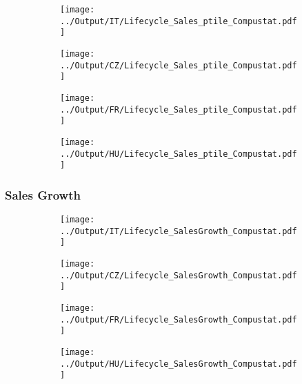 \documentclass[12pt,notitlepage]{article}
\begin{document}
\begin{figure}[!htpb]
\centering
\caption{Sales (Percentile)}
\begin{subfigure}{.49\textwidth}
    \centering
 \texttt{[image: ../Output/IT/Lifecycle\_Sales\_ptile\_Compustat.pdf]}
\end{subfigure}%
\begin{subfigure}{.49\textwidth}
    \centering
 \texttt{[image: ../Output/CZ/Lifecycle\_Sales\_ptile\_Compustat.pdf]}
\end{subfigure}
\begin{subfigure}{.49\textwidth}
    \centering
 \texttt{[image: ../Output/FR/Lifecycle\_Sales\_ptile\_Compustat.pdf]}
\end{subfigure}%
\begin{subfigure}{.49\textwidth}
    \centering
 \texttt{[image: ../Output/HU/Lifecycle\_Sales\_ptile\_Compustat.pdf]}
\end{subfigure}
\end{figure}
\pagebreak

\subsubsection{Sales Growth}
\begin{figure}[!htpb]
\centering
\caption{Employment (Average)}
\begin{subfigure}{.49\textwidth}
    \centering
 \texttt{[image: ../Output/IT/Lifecycle\_SalesGrowth\_Compustat.pdf]}
\end{subfigure}%
\begin{subfigure}{.49\textwidth}
    \centering
 \texttt{[image: ../Output/CZ/Lifecycle\_SalesGrowth\_Compustat.pdf]}
\end{subfigure}
\begin{subfigure}{.49\textwidth}
    \centering
 \texttt{[image: ../Output/FR/Lifecycle\_SalesGrowth\_Compustat.pdf]}
\end{subfigure}%
\begin{subfigure}{.49\textwidth}
    \centering
 \texttt{[image: ../Output/HU/Lifecycle\_SalesGrowth\_Compustat.pdf]}
\end{subfigure}
\end{figure}
\pagebreak
\end{document}
